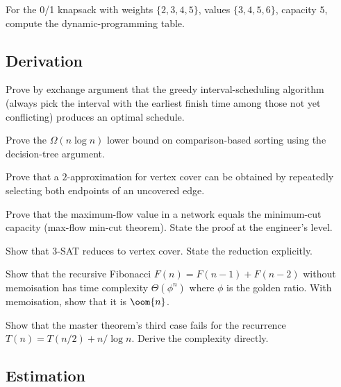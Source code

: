\begin{exercise}
For the 0/1 knapsack with weights $\{2, 3, 4, 5\}$, values $\{3, 4, 5, 6\}$, capacity $5$, compute the dynamic-programming table.
\end{exercise}

\subsection*{Derivation}

\begin{exercise}
Prove by exchange argument that the greedy interval-scheduling algorithm (always pick the interval with the earliest finish time among those not yet conflicting) produces an optimal schedule.
\end{exercise}

\begin{exercise}
Prove the $\Omega(n \log n)$ lower bound on comparison-based sorting using the decision-tree argument.
\end{exercise}

\begin{exercise}
Prove that a $2$-approximation for vertex cover can be obtained by repeatedly selecting both endpoints of an uncovered edge.
\end{exercise}

\begin{exercise}
Prove that the maximum-flow value in a network equals the minimum-cut capacity (max-flow min-cut theorem). State the proof at the engineer's level.
\end{exercise}

\begin{exercise}
Show that 3-SAT reduces to vertex cover. State the reduction explicitly.
\end{exercise}

\begin{exercise}
Show that the recursive Fibonacci $F(n) = F(n-1) + F(n-2)$ without memoisation has time complexity $\Theta(\phi^n)$ where $\phi$ is the golden ratio. With memoisation, show that it is $\oom{n}$.
\end{exercise}

\begin{exercise}
Show that the master theorem's third case fails for the recurrence $T(n) = T(n/2) + n / \log n$. Derive the complexity directly.
\end{exercise}

\subsection*{Estimation}

